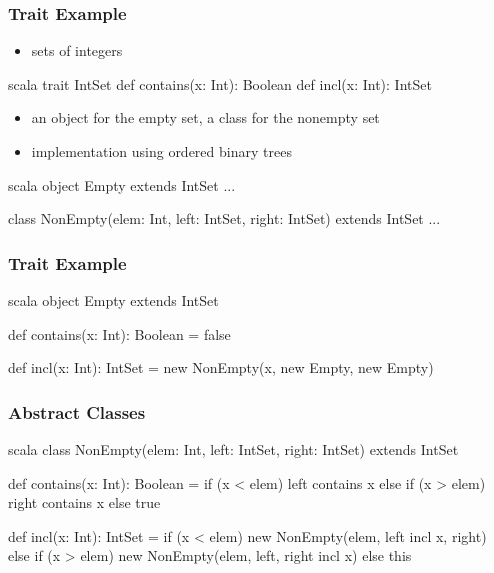 \documentclass[dvipsnames]{beamer}
\theoremstyle{plain}
\begin{document}
\begin{frame}[fragile]
  \frametitle{Trait Example}

  \begin{example}[Scala]
    \begin{itemize}
      \item sets of integers
    \end{itemize}

    \begin{pygments}{scala}
trait IntSet {
    def contains(x: Int): Boolean
    def incl(x: Int): IntSet
}
    \end{pygments}

    \pause
    \begin{itemize}
      \item an object for the empty set, a class for the nonempty set
      \item implementation using ordered binary trees
    \end{itemize}

    \begin{pygments}{scala}
object Empty extends IntSet ...

class NonEmpty(elem: Int, left: IntSet,
               right: IntSet) extends IntSet ...
    \end{pygments}
  \end{example}
\end{frame}

\begin{frame}[fragile]
  \frametitle{Trait Example}

  \begin{example}[Scala]
    \begin{pygments}{scala}
object Empty extends IntSet {
    def contains(x: Int): Boolean = false

    def incl(x: Int): IntSet =
        new NonEmpty(x, new Empty, new Empty)
}
    \end{pygments}
  \end{example}
\end{frame}

\begin{frame}[fragile]
  \frametitle{Abstract Classes}

  \begin{example}[Scala]
    \begin{pygments}{scala}
class NonEmpty(elem: Int, left: IntSet,
               right: IntSet) extends IntSet {
    def contains(x: Int): Boolean =
        if (x < elem) left contains x
        else if (x > elem) right contains x
        else true

    def incl(x: Int): IntSet =
         if (x < elem)
            new NonEmpty(elem, left incl x, right)
         else if (x > elem)
            new NonEmpty(elem, left, right incl x)
         else this
}
    \end{pygments}
  \end{example}
\end{frame}
\end{document}

